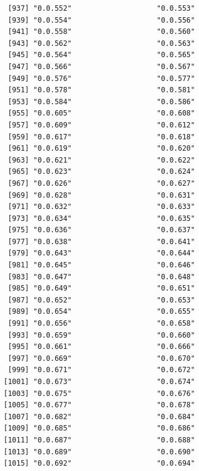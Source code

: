\documentclass[
  letterpaper,
  DIV=11,
  numbers=noendperiod]{scrreprt}
\begin{document}
\begin{verbatim}
 [937] "0.0.552"                    "0.0.553"                   
 [939] "0.0.554"                    "0.0.556"                   
 [941] "0.0.558"                    "0.0.560"                   
 [943] "0.0.562"                    "0.0.563"                   
 [945] "0.0.564"                    "0.0.565"                   
 [947] "0.0.566"                    "0.0.567"                   
 [949] "0.0.576"                    "0.0.577"                   
 [951] "0.0.578"                    "0.0.581"                   
 [953] "0.0.584"                    "0.0.586"                   
 [955] "0.0.605"                    "0.0.608"                   
 [957] "0.0.609"                    "0.0.612"                   
 [959] "0.0.617"                    "0.0.618"                   
 [961] "0.0.619"                    "0.0.620"                   
 [963] "0.0.621"                    "0.0.622"                   
 [965] "0.0.623"                    "0.0.624"                   
 [967] "0.0.626"                    "0.0.627"                   
 [969] "0.0.628"                    "0.0.631"                   
 [971] "0.0.632"                    "0.0.633"                   
 [973] "0.0.634"                    "0.0.635"                   
 [975] "0.0.636"                    "0.0.637"                   
 [977] "0.0.638"                    "0.0.641"                   
 [979] "0.0.643"                    "0.0.644"                   
 [981] "0.0.645"                    "0.0.646"                   
 [983] "0.0.647"                    "0.0.648"                   
 [985] "0.0.649"                    "0.0.651"                   
 [987] "0.0.652"                    "0.0.653"                   
 [989] "0.0.654"                    "0.0.655"                   
 [991] "0.0.656"                    "0.0.658"                   
 [993] "0.0.659"                    "0.0.660"                   
 [995] "0.0.661"                    "0.0.666"                   
 [997] "0.0.669"                    "0.0.670"                   
 [999] "0.0.671"                    "0.0.672"                   
[1001] "0.0.673"                    "0.0.674"                   
[1003] "0.0.675"                    "0.0.676"                   
[1005] "0.0.677"                    "0.0.678"                   
[1007] "0.0.682"                    "0.0.684"                   
[1009] "0.0.685"                    "0.0.686"                   
[1011] "0.0.687"                    "0.0.688"                   
[1013] "0.0.689"                    "0.0.690"                   
[1015] "0.0.692"                    "0.0.694"                   

\end{verbatim}
\end{document}
